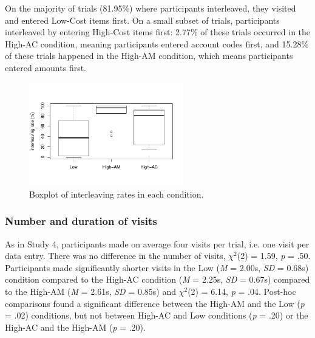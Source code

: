 On the majority of trials (81.95\%) where participants interleaved, they visited and entered Low-Cost items first. On a small subset of trials, participants interleaved by entering High-Cost items first: 2.77\% of these trials occurred in the High-AC condition, meaning participants entered account codes first, and 15.28\% of these trials happened in the High-AM condition, which means participants entered amounts first. 

\begin{figure}
 \includegraphics[width=0.6\textwidth]{images/ch34/ch4_5-boxplot.pdf}
\caption[Study 5 boxplot of interleaving rates]{Boxplot of interleaving rates in each condition.}
\label{fig:ch34_5-boxplots}
\end{figure}

\subsubsection{Number and duration of visits}
As in Study 4, participants made on average four visits per trial, i.e. one visit per data entry. There was no difference in the number of visits, $\chi^2$(2) = 1.59, \textit{p} = .50. Participants made significantly shorter visits in the Low (\textit{M} = 2.00s, \textit{SD} = 0.68s) condition compared to the High-AC condition (\textit{M} = 2.25s, \textit{SD} = 0.67s) compared to the High-AM (\textit{M} = 2.61s, \textit{SD} = 0.85s) and  $\chi^2$(2) = 6.14, \textit{p} = .04. Post-hoc comparisons found a significant difference between  the High-AM and the Low (\textit{p} = .02) conditions, but not between High-AC and Low conditions (\textit{p} = .20) or the High-AC and the High-AM (\textit{p} = .20).

